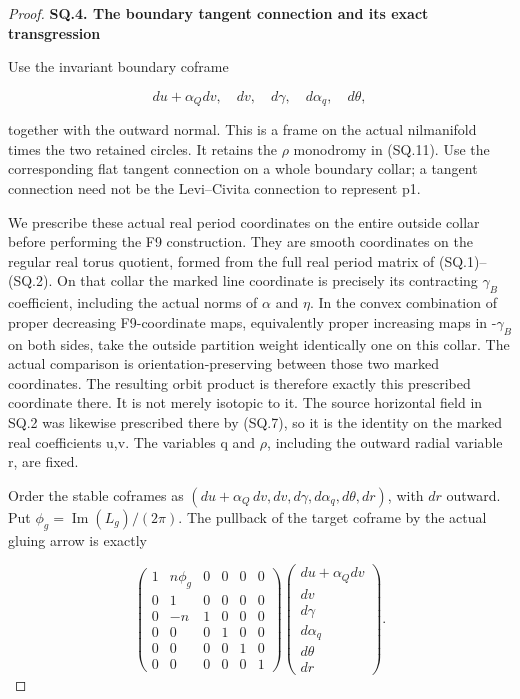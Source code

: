 \begin{proof}
\par

\medskip\noindent\textbf{SQ.4. The boundary tangent connection and its exact transgression}

\par\nobreak

Use the invariant boundary coframe

\[
 du+\alpha_Qdv,\quad dv,\quad d\gamma,\quad
 d\alpha_q,\quad d\theta,
                                                        \tag{SQ.17}
\]

together with the outward normal. This is a frame on the actual
nilmanifold times the two retained circles. It retains the \(\rho\)
monodromy in (SQ.11). Use the corresponding flat tangent connection
on a whole boundary collar; a tangent connection need not be the
Levi--Civita connection to represent p1.

We prescribe these actual real period coordinates on the entire
outside collar before performing the F9 construction. They are smooth
coordinates on the regular real torus quotient, formed from the full
real period matrix of (SQ.1)--(SQ.2). On that collar the marked line coordinate is precisely its
contracting \(\gamma_{B}\) coefficient, including the
actual norms of \(\alpha\) and \(\eta\). In the convex combination of proper decreasing F9-coordinate
maps, equivalently proper increasing maps in -\(\gamma_{B}\) on both sides,
take the outside partition weight identically
one on this collar. The actual comparison is orientation-preserving between those two
marked coordinates. The resulting orbit product is therefore exactly
this prescribed coordinate there. It is not merely isotopic to it.
The source horizontal field in SQ.2 was likewise prescribed there by
(SQ.7), so it is the identity on the marked real coefficients u,v.
The variables q and \(\rho\), including the outward radial variable r,
are fixed.

Order the stable coframes as
\((du+\alpha_Q\,dv,dv,d\gamma,d\alpha_q,d\theta,dr)\), with \(dr\) outward.
Put \(\phi_g=\operatorname{Im}(L_g)/(2\pi)\). The pullback of the target coframe by the
actual gluing arrow is exactly

\[
 \begin{pmatrix}
 1&n\phi_g&0&0&0&0\\
 0&1&0&0&0&0\\
 0&-n&1&0&0&0\\
 0&0&0&1&0&0\\
 0&0&0&0&1&0\\
 0&0&0&0&0&1
 \end{pmatrix}
 \begin{pmatrix}
 du+\alpha_Qdv\\dv\\d\gamma\\d\alpha_q\\d\theta\\dr
 \end{pmatrix}.
                                                        \tag{SQ.18}
\]


\end{proof}
